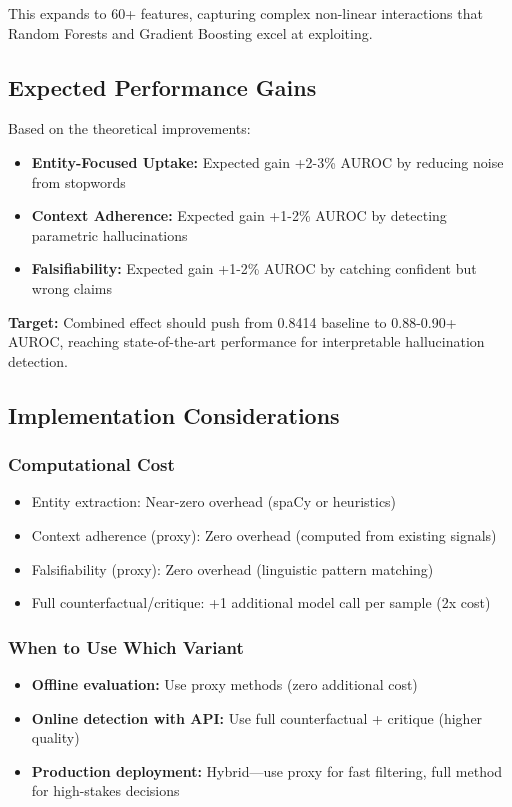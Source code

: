 This expands to 60+ features, capturing complex non-linear interactions that Random Forests and Gradient Boosting excel at exploiting.

\subsection{Expected Performance Gains}

Based on the theoretical improvements:

\begin{itemize}
    \item \textbf{Entity-Focused Uptake:} Expected gain +2-3\% AUROC by reducing noise from stopwords
    \item \textbf{Context Adherence:} Expected gain +1-2\% AUROC by detecting parametric hallucinations
    \item \textbf{Falsifiability:} Expected gain +1-2\% AUROC by catching confident but wrong claims
\end{itemize}

\textbf{Target:} Combined effect should push from 0.8414 baseline to 0.88-0.90+ AUROC, reaching state-of-the-art performance for interpretable hallucination detection.

\subsection{Implementation Considerations}

\subsubsection{Computational Cost}
\begin{itemize}
    \item Entity extraction: Near-zero overhead (spaCy or heuristics)
    \item Context adherence (proxy): Zero overhead (computed from existing signals)
    \item Falsifiability (proxy): Zero overhead (linguistic pattern matching)
    \item Full counterfactual/critique: +1 additional model call per sample (2x cost)
\end{itemize}

\subsubsection{When to Use Which Variant}
\begin{itemize}
    \item \textbf{Offline evaluation:} Use proxy methods (zero additional cost)
    \item \textbf{Online detection with API:} Use full counterfactual + critique (higher quality)
    \item \textbf{Production deployment:} Hybrid—use proxy for fast filtering, full method for high-stakes decisions
\end{itemize}

